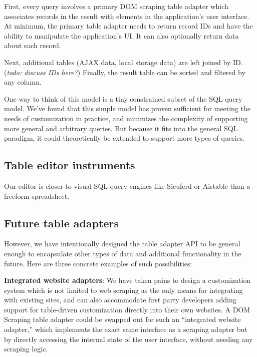 \documentclass[sigplan,10pt,anonymous,review]{acmart}
\begin{document}
First, every query involves a primary DOM scraping table adapter which
associates records in the result with elements in the application's user
interface. At minimum, the primary table adapter needs to return record
IDs and have the ability to manipulate the application's UI. It can also
optionally return data about each record.

Next, additional tables (AJAX data, local storage data) are left joined
by ID. (\emph{todo: discuss IDs here?}) Finally, the result table can be
sorted and filtered by any column.

One way to think of this model is a tiny constrained subset of the SQL
query model. We've found that this simple model has proven sufficient
for meeting the needs of customization in practice, and minimizes the
complexity of supporting more general and arbitrary queries. But because
it fits into the general SQL paradigm, it could theoretically be
extended to support more types of queries.

\hypertarget{table-editor-instruments}{%
\subsection{Table editor instruments}\label{table-editor-instruments}}

Our editor is closer to visual SQL query engines like Sieuferd or
Airtable than a freeform spreadsheet.

\hypertarget{future-table-adapters}{%
\subsection{Future table adapters}\label{future-table-adapters}}

However, we have intentionally designed the table adapter API to be
general enough to encapsulate other types of data and additional
functionality in the future. Here are three concrete examples of such
possibilities:

\textbf{Integrated website adapters}: We have taken pains to design a
customization system which is not limited to web scraping as the only
means for integrating with existing sites, and can also accommodate
first party developers adding support for table-driven customization
directly into their own websites. A DOM Scraping table adapter could be
swapped out for such an ``integrated website adapter,'' which implements
the exact same interface as a scraping adapter but by directly accessing
the internal state of the user interface, without needing any scraping
logic.
\end{document}
